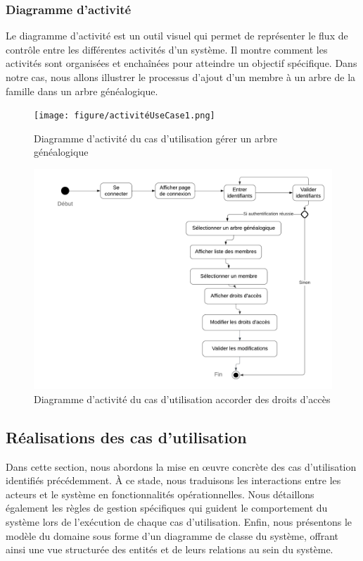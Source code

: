 \subsubsection{Diagramme d'activité}

Le diagramme d’activité est un outil visuel qui permet de représenter le flux
de contrôle entre les différentes activités d’un système. Il montre comment les
activités sont organisées et enchaînées pour atteindre un objectif spécifique.
Dans notre cas, nous allons illustrer le processus d’ajout d’un membre à un
arbre de la famille dans un arbre généalogique.

\begin{figure}[H]
  \centering
  \texttt{[image: figure/activitéUseCase1.png]}
  \caption{Diagramme d'activité du cas d'utilisation gérer un arbre généalogique}
\end{figure}

\begin{figure}[H]
  \centering
  \includegraphics[width=1\textwidth]{figure/usecase2.png}
  \caption{Diagramme d'activité du cas d'utilisation accorder des droits d'accès}
\end{figure}


\subsection{Réalisations des cas d'utilisation}
Dans cette section, nous abordons la mise en œuvre concrète des cas
d’utilisation identifiés précédemment. À ce stade, nous traduisons les
interactions entre les acteurs et le système en fonctionnalités opérationnelles.
Nous détaillons également les règles de gestion spécifiques qui guident le
comportement du système lors de l’exécution de chaque cas d’utilisation. Enfin,
nous présentons le modèle du domaine sous forme d’un diagramme de classe du
système, offrant ainsi une vue structurée des entités et de leurs relations
au sein du système.
